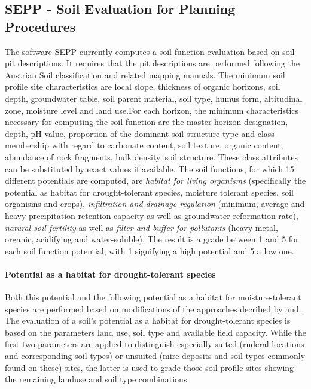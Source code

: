 \documentclass[soilsystems,article,submit,moreauthors,pdftex,10pt,a4paper]{Definitions/mdpi}
\begin{document}
\subsection{SEPP - Soil Evaluation for Planning Procedures}
The software SEPP currently computes a soil function evaluation based on soil pit descriptions. It requires that the pit descriptions are performed following the Austrian Soil classification  \citep{Nestroy2000,Nestroy2011} and related mapping manuals. The minimum  soil profile site characteristics are local slope, thickness of organic horizons, soil depth, groundwater table, soil parent material, soil type, humus form, altitudinal zone, moisture level and land use.For each horizon, the minimum characteristics necessary for computing the soil function are the master horizon designation, depth, pH value, proportion of the dominant soil structure type and class membership with regard to carbonate content, soil texture, organic content, abundance of rock fragments, bulk density, soil structure. These class attributes can be substituted by exact values if available. The soil functions, for which 15 different potentials are computed, are  \emph{habitat for living organisms} (specifically the potential as habitat for drought-tolerant species, moisture tolerant species, soil organisms and crops),  \emph{infiltration and drainage regulation} (minimum, average and heavy precipitation retention capacity as well as groundwater reformation rate), \emph{natural soil fertility} as well as \emph{filter and buffer for pollutants} (heavy metal, organic, acidifying and water-soluble). The result is a grade between 1 and 5 for each soil function potential, with 1 signifying a high potential and 5 a low one.

\paragraph{Potential as a habitat for drought-tolerant species} 
Both this potential and the following potential as a habitat for moisture-tolerant species are performed based on modifications of the approaches decribed by \cite{BAYGLA2003} and \cite{Lehmann2008}.
The evaluation of a soil's potential  as a habitat for drought-tolerant species is based on the parameters land use, soil type and available field capacity. While the first two parameters are applied to distinguish especially suited (ruderal locations and corresponding soil types) or unsuited (mire deposits and soil types commonly found on these) sites, the latter is used to grade those soil profile sites showing the remaining landuse and soil type combinations. 
\end{document}
